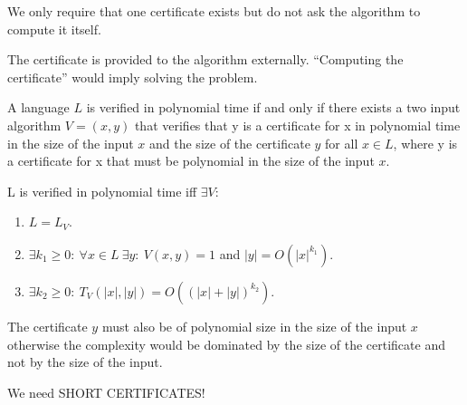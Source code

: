 We only require that one certificate exists but do not ask the algorithm to compute it itself.

The certificate is provided to the algorithm externally. ``Computing the certificate'' would imply solving the problem.

\begin{notesdefinition}
A language $L$ is verified in polynomial time if and only if there exists a two input algorithm $V=(x,y)$ that verifies that y is a certificate for x in polynomial time in the size of the input $x$ and the size of the certificate $y$ for all $x\in L$, where y is a certificate for x that must be polynomial in the size of the input $x$.


L is verified in polynomial time iff $\exists V$:
\begin{enumerate}
\item $L=L_V$.
\item $\exists k_1\geq0:\ \forall x\in L\ \exists y:\ V(x,y)=1$ and $|y|=O(|x|^{k_1})$.
\item $\exists k_2\geq0:\ T_V(|x|,|y|)=O((|x|+|y|)^{k_2})$.
\end{enumerate}
\end{notesdefinition}

The certificate $y$ must also be of polynomial size in the size of the input $x$ otherwise the complexity would be dominated by the size of the certificate and not by the size of the input.

We need SHORT CERTIFICATES!
